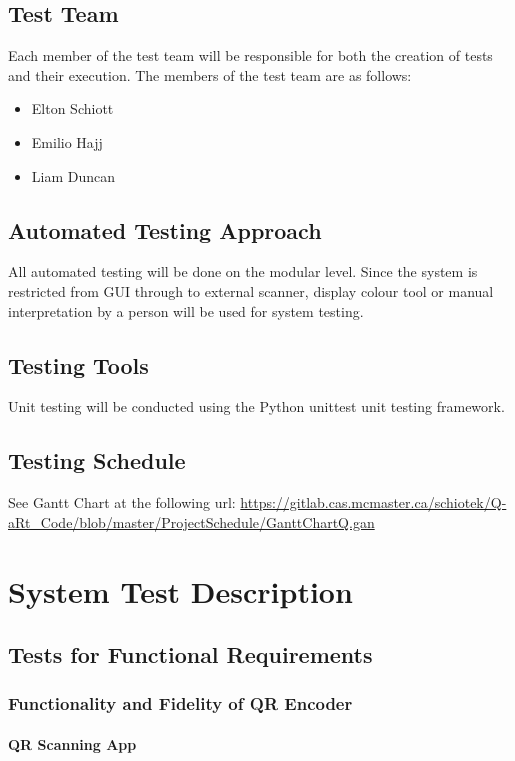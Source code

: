 \documentclass[12pt, titlepage]{article}
\begin{document}
\subsection{Test Team}
	Each member of the test team will be responsible for both the creation of 
	tests and their execution. The members of the test team are as follows:
	\begin{itemize}
		\item Elton Schiott
		\item Emilio Hajj
		\item Liam Duncan
	\end{itemize}
\subsection{Automated Testing Approach}
	All automated testing will be done on the modular level. 
    Since the system is restricted from GUI through to external scanner, display colour tool or manual interpretation by a person will be used for system testing.

\subsection{Testing Tools}
	Unit testing will be conducted using the Python unittest unit testing framework.
\subsection{Testing Schedule}
		
See Gantt Chart at the following url:
\url{https://gitlab.cas.mcmaster.ca/schiotek/Q-aRt_Code/blob/master/ProjectSchedule/GanttChartQ.gan}

\section{System Test Description}
	
\subsection{Tests for Functional Requirements}

\subsubsection{Functionality and Fidelity of QR Encoder}
		
\paragraph{QR Scanning App}
\end{document}
